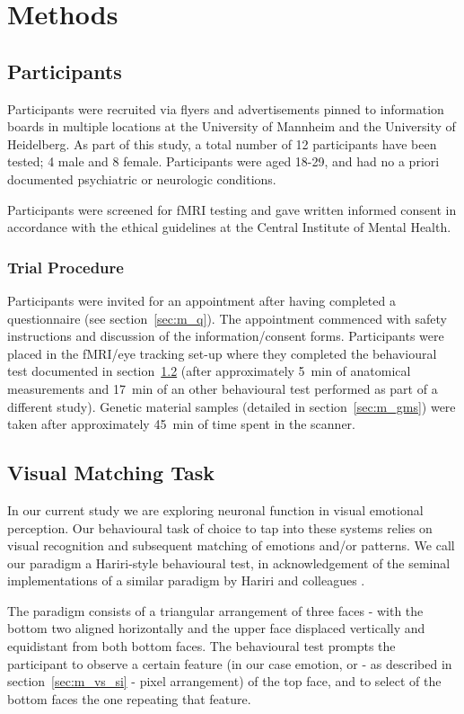 \chapter{Methods}\label{sec:m}
    \section{Participants}\label{sec:m_p}
	Participants were recruited via flyers and advertisements pinned to information boards in multiple locations at the University of Mannheim and the University of Heidelberg.
	As part of this study, a total number of 12 participants have been tested; 4 male and 8 female.
	Participants were aged 18-29, and had no a priori documented psychiatric or neurologic conditions.
	
	Participants were screened for fMRI testing and gave written informed consent in accordance with the ethical guidelines at the Central Institute of Mental Health.
	\subsection{Trial Procedure}
	    Participants were invited for an appointment after having completed a questionnaire (see section~\ref{sec:m_q}).
	    The appointment commenced with safety instructions and discussion of the information/consent forms.
	    Participants were placed in the fMRI/eye tracking set-up where they completed the behavioural test documented in section~\ref{sec:m_bt} (after approximately \SI{5}{\minute} of anatomical measurements and \SI{17}{\minute} of an other behavioural test performed as part of a different study).
	    Genetic material samples (detailed in section~\ref{sec:m_gms}) were taken after approximately \SI{45}{\minute} of time spent in the scanner.
    \section{Visual Matching Task}\label{sec:m_bt}
	In our current study we are exploring neuronal function in visual emotional perception.
	Our behavioural task of choice to tap into these systems relies on visual recognition and subsequent matching of emotions and/or patterns.
	We call our paradigm a Hariri-style behavioural test, in acknowledgement of the seminal implementations of a similar paradigm by Hariri and colleagues \citep{Hariri2000,Hariri2003}.
	    
	The paradigm consists of a triangular arrangement of three faces - with the bottom two aligned horizontally and the upper face displaced vertically and equidistant from both bottom faces.
	The behavioural test prompts the participant to observe a certain feature (in our case emotion, or - as described in section~\ref{sec:m_vs_si} - pixel arrangement) of the top face, and to select of the bottom faces the one repeating that feature.
	
